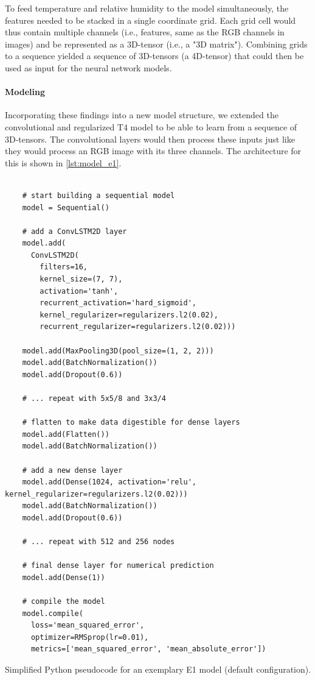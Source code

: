 To feed temperature and relative humidity to the model simultaneously, the features needed to be stacked in a single coordinate grid. Each grid cell would thus contain multiple channels (i.e., features, same as the RGB channels in images) and be represented as a 3D-tensor (i.e., a "3D matrix"). Combining grids to a sequence yielded a sequence of 3D-tensors (a 4D-tensor) that could then be used as input for the neural network models.

\paragraph{Modeling}
\label{ssst:nn_e1_modeling}
Incorporating these findings into a new model structure, we extended the convolutional and regularized T4 model to be able to learn from a sequence of 3D-tensors. The convolutional layers would then process these inputs just like they would process an RGB image with its three channels. The architecture for this is shown in \cref{lst:model_e1}.

\begin{listing}[h!]
  \begin{verbatim}

    # start building a sequential model
    model = Sequential()

    # add a ConvLSTM2D layer
    model.add(
      ConvLSTM2D(
        filters=16,
        kernel_size=(7, 7),
        activation='tanh',
        recurrent_activation='hard_sigmoid',
        kernel_regularizer=regularizers.l2(0.02),
        recurrent_regularizer=regularizers.l2(0.02)))

    model.add(MaxPooling3D(pool_size=(1, 2, 2)))
    model.add(BatchNormalization())
    model.add(Dropout(0.6))

    # ... repeat with 5x5/8 and 3x3/4

    # flatten to make data digestible for dense layers
    model.add(Flatten())
    model.add(BatchNormalization())

    # add a new dense layer
    model.add(Dense(1024, activation='relu', kernel_regularizer=regularizers.l2(0.02)))
    model.add(BatchNormalization())
    model.add(Dropout(0.6))

    # ... repeat with 512 and 256 nodes

    # final dense layer for numerical prediction
    model.add(Dense(1))

    # compile the model
    model.compile(
      loss='mean_squared_error',
      optimizer=RMSprop(lr=0.01),
      metrics=['mean_squared_error', 'mean_absolute_error'])

  \end{verbatim}
  \caption{Simplified Python pseudocode for an exemplary E1 model (default configuration).}
  \label{lst:model_e1}
\end{listing}

